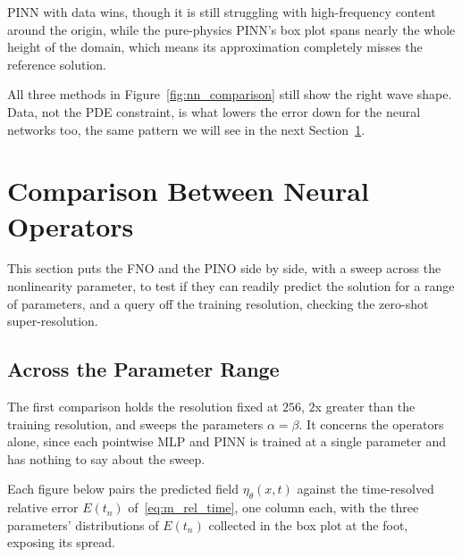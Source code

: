 PINN with data wins, though it is still struggling with high-frequency content around the origin, while the pure-physics PINN's box plot spans nearly the whole height of the domain, which means its approximation completely misses the reference solution.

All three methods in Figure~\ref{fig:nn_comparison} still show the right wave shape. Data, not the PDE constraint, is what lowers the error down for the neural networks too, the same pattern we will see in the next Section~\ref{sec:r_no_comparison}.

\section{Comparison Between Neural Operators}
\label{sec:r_no_comparison}

This section puts the FNO and the PINO side by side, with a sweep across the nonlinearity parameter, to test if they can readily predict the solution for a range of parameters, and a query off the training resolution, checking the zero-shot super-resolution.

\subsection{Across the Parameter Range}
\label{sec:r_params}

The first comparison holds the resolution fixed at $256$, $2$x greater than the training resolution, and sweeps the parameters $\alpha=\beta$. It concerns the operators alone, since each pointwise MLP and PINN is trained at a single parameter and has nothing to say about the sweep. 

Each figure below pairs the predicted field $\eta_\theta(x,t)$ against the time-resolved relative error $E(t_n)$ of~\eqref{eq:m_rel_time}, one column each, with the three parameters' distributions of $E(t_n)$ collected in the box plot at the foot, exposing its spread.

